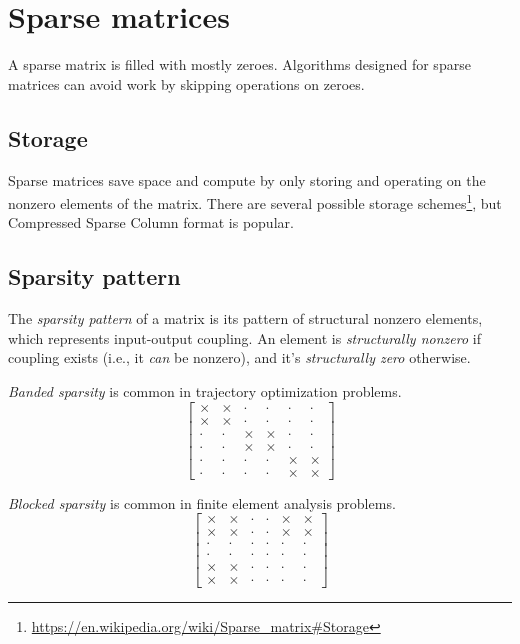 \section{Sparse matrices}

A sparse matrix is filled with mostly zeroes. Algorithms designed for sparse
matrices can avoid work by skipping operations on zeroes.

\subsection{Storage}

Sparse matrices save space and compute by only storing and operating on the
nonzero elements of the matrix. There are several possible storage
schemes\footnote{\url{https://en.wikipedia.org/wiki/Sparse_matrix\#Storage}},
but Compressed Sparse Column format is popular.

\subsection{Sparsity pattern}

The \textit{sparsity pattern} of a matrix is its pattern of structural nonzero
elements, which represents input-output coupling. An element is
\textit{structurally nonzero} if coupling exists (i.e., it \textit{can} be
nonzero), and it's \textit{structurally zero} otherwise.

\textit{Banded sparsity} is common in trajectory optimization problems.
\begin{equation*}
  \begin{bmatrix}
    \times & \times & \cdot & \cdot & \cdot & \cdot \\
    \times & \times & \cdot & \cdot & \cdot & \cdot \\
    \cdot & \cdot & \times & \times & \cdot & \cdot \\
    \cdot & \cdot & \times & \times & \cdot & \cdot \\
    \cdot & \cdot & \cdot & \cdot & \times & \times \\
    \cdot & \cdot & \cdot & \cdot & \times & \times
  \end{bmatrix}
\end{equation*}

\textit{Blocked sparsity} is common in finite element analysis problems.
\begin{equation*}
  \begin{bmatrix}
    \times & \times & \cdot & \cdot & \times & \times \\
    \times & \times & \cdot & \cdot & \times & \times \\
    \cdot & \cdot & \cdot & \cdot & \cdot & \cdot \\
    \cdot & \cdot & \cdot & \cdot & \cdot & \cdot \\
    \times & \times & \cdot & \cdot & \cdot & \cdot \\
    \times & \times & \cdot & \cdot & \cdot & \cdot
  \end{bmatrix}
\end{equation*}

